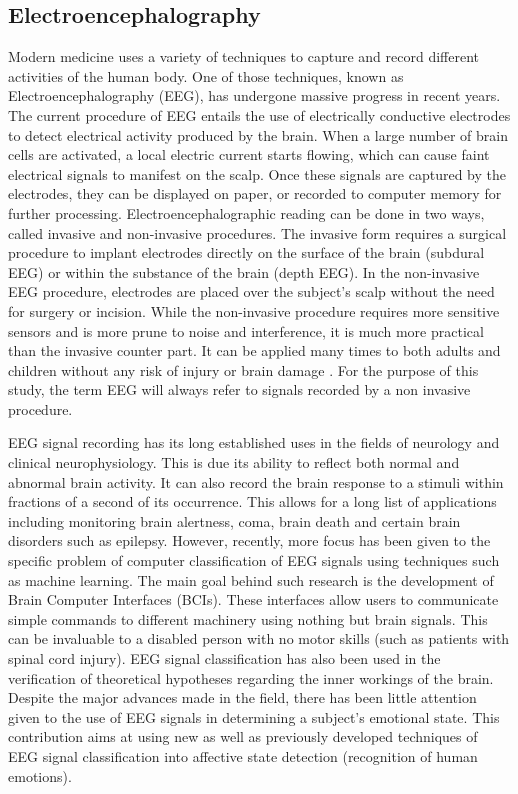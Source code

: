 \documentclass[12pt, a4paper, fleqn]{memoir}%
\begin{document}
\subsection{Electroencephalography}
Modern medicine uses a variety of techniques to capture and record different activities of the human body. One of those techniques, known as Electroencephalography (EEG), has undergone massive progress in recent years. The current procedure of EEG entails the use of electrically conductive electrodes to detect electrical activity produced by the brain. When a large number of brain cells are activated, a local electric current starts flowing, which can cause faint electrical signals to manifest on the scalp. Once these signals are captured by the electrodes, they can be displayed on paper, or recorded to computer memory for further processing. Electroencephalographic reading can be done in two ways, called invasive and non-invasive procedures. The invasive form requires a surgical procedure to implant electrodes directly on the surface of the brain (subdural EEG) or within the substance of the brain (depth EEG). In the non-invasive EEG procedure, electrodes are placed over the subject's scalp without the need for surgery or incision. While the non-invasive procedure requires more sensitive sensors and is more prune to noise and interference, it is much more practical than the invasive counter part. It can be applied many times to both adults and children without any risk of injury or brain damage \cite{teplan2002fundamentals}. For the purpose of this study, the term EEG will always refer to signals recorded by a non invasive procedure.

EEG signal recording has its long established uses in the fields of neurology and clinical neurophysiology. This is due its ability to reflect both normal and abnormal brain activity. It can also record the brain response to a stimuli within fractions of a second of its occurrence. This allows for a long list of applications including monitoring brain alertness, coma, brain death and certain brain disorders such as epilepsy. However, recently, more focus has been given to the specific problem of computer classification of EEG signals using techniques such as machine learning. The main goal behind such research is the development of Brain Computer Interfaces (BCIs). These interfaces allow users to communicate simple commands to different machinery using nothing but brain signals. This can be invaluable to a disabled person with no motor skills (such as patients with spinal cord injury). EEG signal classification has also been used in the verification of theoretical hypotheses regarding the inner workings of the brain. Despite the major advances made in the field, there has been little attention given to the use of EEG signals in determining a subject's emotional state. This contribution aims at using new as well as previously developed techniques of EEG signal classification into affective state detection (recognition of human emotions). 
\end{document}
